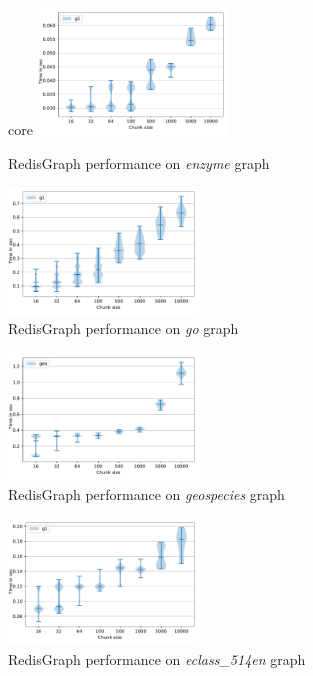 \begin{figure}[h]core
\centering
\includegraphics[width=0.45\textwidth]{data/raw_redis/enzyme.pdf}
\caption{RedisGraph performance on \textit{enzyme} graph}
\label{fig:redis_enzyme_all}
\end{figure}


\begin{figure}[h]
\centering
\includegraphics[width=0.45\textwidth]{data/raw_redis/go.pdf}
\caption{RedisGraph performance on \textit{go} graph}
\label{fig:redis_go_all}
\end{figure}

\begin{figure}[h]
\centering
\includegraphics[width=0.45\textwidth]{data/raw_redis/geospecies.pdf}
\caption{RedisGraph performance on \textit{geospecies} graph}
\label{fig:redis_geospecies_all}
\end{figure}

\begin{figure}[h]
\centering
\includegraphics[width=0.45\textwidth]{data/raw_redis/eclass_514en.pdf}
\caption{RedisGraph performance on \textit{eclass\_514en} graph}
\label{fig:redis_eclass_all}
\end{figure}

